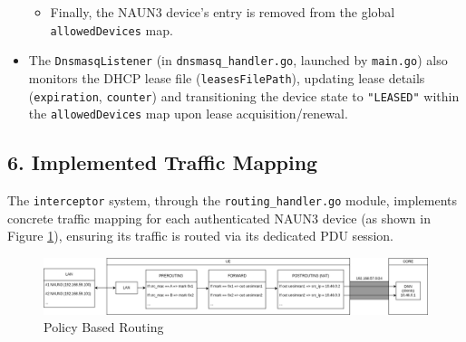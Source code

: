 \begin{itemize}
{\begin{itemize}
            \item Finally, the \ac{NAUN3} device's entry is removed from the global \texttt{allowedDevices} map.
        \end{itemize}
    }

    \item The \texttt{DnsmasqListener} (in \texttt{dnsmasq\_handler.go}, launched by \texttt{main.go}) also monitors the \ac{DHCP} lease file (\texttt{leasesFilePath}), updating lease details (\texttt{expiration}, \texttt{counter}) and transitioning the device state to \texttt{"LEASED"} within the \texttt{allowedDevices} map upon lease acquisition/renewal.
\end{itemize}

\subsection{6. Implemented Traffic Mapping}

The \texttt{interceptor} system, through the \texttt{routing\_handler.go} module, implements concrete traffic mapping for each authenticated \ac{NAUN3} device (as shown in Figure \ref{fig:policy-based-routing}), ensuring its traffic is routed via its dedicated \ac{PDU} session.

\begin{figure}
    \centering
    \includegraphics[width=1\linewidth]{figs/topology-Policy Based Routing.png}
    \caption{Policy Based Routing}
    \label{fig:policy-based-routing}
\end{figure}

